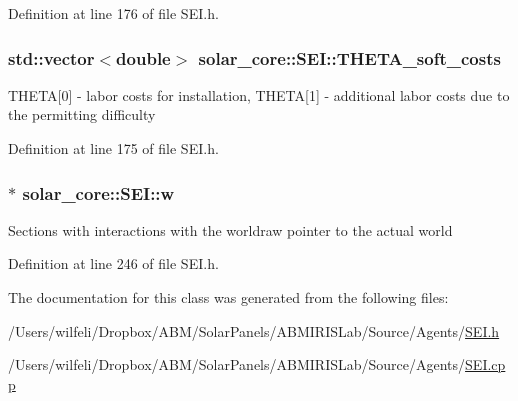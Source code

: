 Definition at line 176 of file S\+E\+I.\+h.

\hypertarget{classsolar__core_1_1_s_e_i_a1be690a943dc872af0ed3540c81f1d6b}{}
\subsubsection[{T\+H\+E\+T\+A\+\_\+soft\+\_\+costs}]{\setlength{\rightskip}{0pt plus 5cm}std\+::vector$<$double$>$ solar\+\_\+core\+::\+S\+E\+I\+::\+T\+H\+E\+T\+A\+\_\+soft\+\_\+costs\hspace{0.3cm}{\ttfamily [protected]}}\label{classsolar__core_1_1_s_e_i_a1be690a943dc872af0ed3540c81f1d6b}
T\+H\+E\+T\+A\mbox{[}0\mbox{]} -\/ labor costs for installation, T\+H\+E\+T\+A\mbox{[}1\mbox{]} -\/ additional labor costs due to the permitting difficulty 

Definition at line 175 of file S\+E\+I.\+h.

\hypertarget{classsolar__core_1_1_s_e_i_a82e0c6b5f6d83639a08c1bc357fd3466}{}
\subsubsection[{w}]{$\ast$ solar\+\_\+core\+::\+S\+E\+I\+::w\hspace{0.3cm}{\ttfamily [protected]}}\label{classsolar__core_1_1_s_e_i_a82e0c6b5f6d83639a08c1bc357fd3466}
Sections with interactions with the worldraw pointer to the actual world 

Definition at line 246 of file S\+E\+I.\+h.



The documentation for this class was generated from the following files\+:\begin{DoxyCompactItemize}
\item 
/\+Users/wilfeli/\+Dropbox/\+A\+B\+M/\+Solar\+Panels/\+A\+B\+M\+I\+R\+I\+S\+Lab/\+Source/\+Agents/\hyperlink{_s_e_i_8h}{S\+E\+I.\+h}\item 
/\+Users/wilfeli/\+Dropbox/\+A\+B\+M/\+Solar\+Panels/\+A\+B\+M\+I\+R\+I\+S\+Lab/\+Source/\+Agents/\hyperlink{_s_e_i_8cpp}{S\+E\+I.\+cpp}\end{DoxyCompactItemize}
